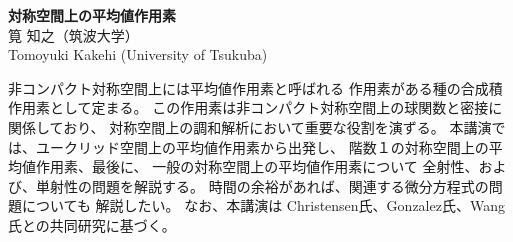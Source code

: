 \documentclass[a4paper,leqno,11pt]{article}
\theoremstyle{plain}
\theoremstyle{definition}
\theoremstyle{remark}
\begin{document}
%
%
\begin{Large}
\begin{center}
{\bf 対称空間上の平均値作用素}
\vspace{12pt}
\\
筧 知之（筑波大学）
\\
{\sc Tomoyuki Kakehi} (University of Tsukuba) 
\end{center} 
\end{Large}
%
%
非コンパクト対称空間上には平均値作用素と呼ばれる
作用素がある種の合成積作用素として定まる。
この作用素は非コンパクト対称空間上の球関数と密接に関係しており、
対称空間上の調和解析において重要な役割を演ずる。
本講演では、ユークリッド空間上の平均値作用素から出発し、
階数１の対称空間上の平均値作用素、最後に、
一般の対称空間上の平均値作用素について
全射性、および、単射性の問題を解説する。
時間の余裕があれば、関連する微分方程式の問題についても
解説したい。
なお、本講演は
Christensen氏、Gonzalez氏、Wang氏との共同研究に基づく。 
\end{document}
